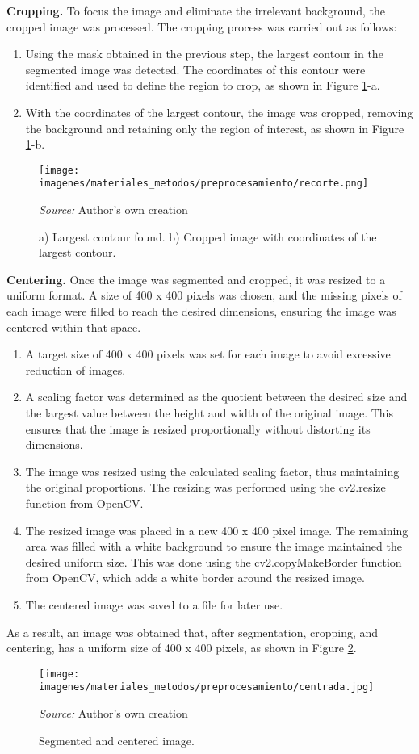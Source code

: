 \textbf{Cropping.}
To focus the image and eliminate the irrelevant background, the cropped image was processed. The cropping process was carried out as follows:
\begin{enumerate}
	\item Using the mask obtained in the previous step, the largest contour in the segmented image was detected. The coordinates of this contour were identified and used to define the region to crop, as shown in Figure \ref{fig:recorte}-a.
	\item With the coordinates of the largest contour, the image was cropped, removing the background and retaining only the region of interest, as shown in Figure \ref{fig:recorte}-b.
\end{enumerate}

\begin{figure}[htbp]
    \centering
    \texttt{[image: imagenes/materiales\_metodos/preprocesamiento/recorte.png]}
    \caption{a) Largest contour found. b) Cropped image with coordinates of the largest contour.}
    \label{fig:recorte}
    \scriptsize \textit{Source:} Author's own creation
\end{figure}

\textbf{Centering.}
Once the image was segmented and cropped, it was resized to a uniform format. A size of 400 x 400 pixels was chosen, and the missing pixels of each image were filled to reach the desired dimensions, ensuring the image was centered within that space.
\begin{enumerate}
	\item A target size of 400 x 400 pixels was set for each image to avoid excessive reduction of images. 
	\item A scaling factor was determined as the quotient between the desired size and the largest value between the height and width of the original image. This ensures that the image is resized proportionally without distorting its dimensions.
	\item The image was resized using the calculated scaling factor, thus maintaining the original proportions. The resizing was performed using the cv2.resize function from OpenCV.
	\item The resized image was placed in a new 400 x 400 pixel image. The remaining area was filled with a white background to ensure the image maintained the desired uniform size. This was done using the cv2.copyMakeBorder function from OpenCV, which adds a white border around the resized image.
	\item The centered image was saved to a file for later use.
\end{enumerate}

As a result, an image was obtained that, after segmentation, cropping, and centering, has a uniform size of 400 x 400 pixels, as shown in Figure \ref{fig:centrada}.

\begin{figure}[htbp]
    \centering
    \texttt{[image: imagenes/materiales\_metodos/preprocesamiento/centrada.jpg]}
    \caption{Segmented and centered image.}
    \scriptsize \textit{Source:} Author's own creation
    \label{fig:centrada}
\end{figure}